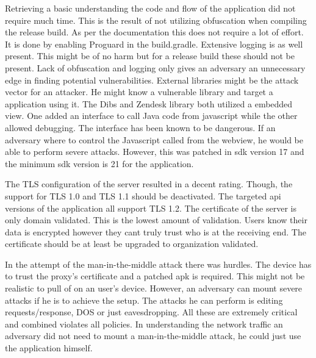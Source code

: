 Retrieving a basic understanding the code and flow of the application did not require much time. This is the result of not utilizing obfuscation when compiling the release build. As per the documentation\cite{android-obfuscation} this does not require a lot of effort. It is done by enabling Proguard in the build.gradle. Extensive logging is as well present. This might be of no harm but for a release build these should not be present. Lack of obfuscation and logging only gives an adversary an unnecessary edge in finding potential vulnerabilities. External libraries might be the attack vector for an attacker. He might know a vulnerable library and target a application using it. The Dibs and Zendesk library both utilized a embedded view. One added an interface to call Java code from javascript while the other allowed debugging. The interface has been known to be dangerous. If an adversary where to control the Javascript called from the webview, he would be able to perform severe attacks. However, this was patched in sdk version 17 and the minimum sdk version is 21 for the application.

The TLS configuration of the server resulted in a decent rating. Though, the support for TLS 1.0 and TLS 1.1 should be deactivated. The targeted api versions of the application all support TLS 1.2\cite{android-sslsocket}. The certificate of the server is only domain validated. This is the lowest amount of validation. Users know their data is encrypted however they cant truly trust who is at the receiving end. The certificate should be at least be upgraded to organization validated.

In the attempt of the man-in-the-middle attack there was hurdles. The device has to trust the proxy's certificate and a patched apk is required. This might not be realistic to pull of on an user's device. However, an adversary can mount severe attacks if he is to achieve the setup. The attacks he can perform is editing requests/response, DOS or just eavesdropping. All these are extremely critical and combined violates all policies. In understanding the network traffic an adversary did not need to mount a man-in-the-middle attack, he could just use the application himself.

